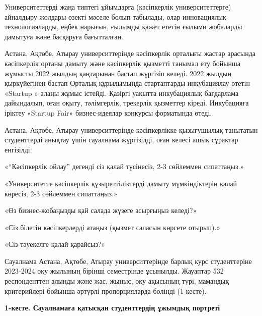 \begin{multicols}{2}
Университеттерді жаңа типтегі ұйымдарға (кәсіпкерлік университеттерге)
айналдыру жолдары өзекті мәселе болып табылады, олар инновациялық
технологияларды, еңбек нарығын, ғылымды қажет ететін ғылыми жобаларды
дамытуға және басқаруға бағытталған.

Астана, Ақтөбе, Атырау университтерінде кәсіпкерлік орталығы жастар
арасында кәсіпкерлік ортаны дамыту және кәсіпкерлік қызметті танымал ету
бойынша жұмысты 2022 жылдың қаңтарынан бастап жүргізіп келеді. 2022
жылдың қыркүйегінен бастап Орталық құрылымында стартаптарды инкубациялау
өтетін «Startup » алаңы жұмыс істейді. Қазіргі уақытта инкубациялық
бағдарлама дайындалып, оған оқыту, тәлімгерлік, трекерлік қызметтер
кіреді. Инкубацияға іріктеу «Startup Fair» бизнес-идеялар конкурсы
форматында өтеді.

Астана, Ақтөбе, Атырау университтерінде кәсіпкерлікке қызығушылық
танытатын студенттерді анықтау үшін сауалнама жүргізілді, оған келесі
ашық сұрақтар енгізілді:

«``Кәсіпкерлік ойлау'' дегенді сіз қалай түсінесіз, 2-3 сөйлеммен
сипаттаңыз.»

«Университетте кәсіпкерлік құзыреттіліктерді дамыту мүмкіндіктерін қалай
көресіз, 2-3 сөйлеммен сипаттаңыз.»

«Өз бизнес-жобаңызды қай салада жүзеге асырғыңыз келеді?»

«Сіз білетін кәсіпкерлерді атаңыз (қызмет саласын көрсете отырып).»

«Сіз тәуекелге қалай қарайсыз?»

Сауалнама Астана, Ақтөбе, Атырау университтерінде барлық курс
студенттеріне 2023-2024 оқу жылының бірінші семестрінде ұсынылды.
Жауаптар 532 респонденттен алынды және жас, жыныс, оқу ақысының түрі,
мамандық критерийлері бойынша әртүрлі пропорцияларда бөлінді (1-кесте).
\end{multicols}

{\bfseries 1-кесте. Сауалнамаға қатысқан студенттердің ұжымдық портреті}

% 
% 
% 
% 
% 
% 
% 
% 
% 
% 
% 
% 
% 
% 
% 
% 

